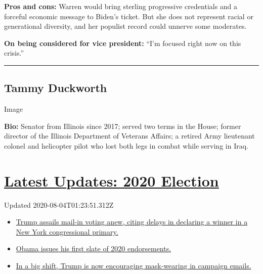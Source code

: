\textbf{Pros and cons:} Warren would bring sterling progressive
credentials and a forceful economic message to Biden's ticket. But she
does not represent racial or generational diversity, and her populist
record could unnerve some moderates.

\textbf{On being considered for vice president:} ``I'm focused right now
on this crisis.''

\begin{center}\rule{0.5\linewidth}{\linethickness}\end{center}

\hypertarget{tammy-duckworth}{%
\subsection{Tammy Duckworth}\label{tammy-duckworth}}

Image

\textbf{Bio:} Senator from Illinois since 2017; served two terms in the
House; former director of the Illinois Department of Veterans Affairs; a
retired Army lieutenant colonel and helicopter pilot who lost both legs
in combat while serving in Iraq.

\hypertarget{latest-updates-2020-election}{%
\section{\texorpdfstring{\href{https://www.nytimes.com/2020/08/03/us/elections/biden-vs-trump.html?action=click\&pgtype=Article\&state=default\&region=MAIN_CONTENT_1\&context=storylines_live_updates}{Latest
Updates: 2020
Election}}{Latest Updates: 2020 Election}}\label{latest-updates-2020-election}}

Updated 2020-08-04T01:23:51.312Z

\begin{itemize}
\tightlist
\item
  \href{https://www.nytimes.com/2020/08/03/us/elections/biden-vs-trump.html?action=click\&pgtype=Article\&state=default\&region=MAIN_CONTENT_1\&context=storylines_live_updates\#link-6494b448}{Trump
  assails mail-in voting anew, citing delays in declaring a winner in a
  New York congressional primary.}
\item
  \href{https://www.nytimes.com/2020/08/03/us/elections/biden-vs-trump.html?action=click\&pgtype=Article\&state=default\&region=MAIN_CONTENT_1\&context=storylines_live_updates\#link-3de249e6}{Obama
  issues his first slate of 2020 endorsements.}
\item
  \href{https://www.nytimes.com/2020/08/03/us/elections/biden-vs-trump.html?action=click\&pgtype=Article\&state=default\&region=MAIN_CONTENT_1\&context=storylines_live_updates\#link-54e34d20}{In
  a big shift, Trump is now encouraging mask-wearing in campaign
  emails.}
\end{itemize}

